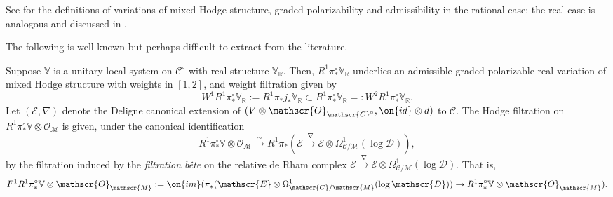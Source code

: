 See \cite[Definitions 14.44, 14.45, and 14.49]{peters2008mixed} for the definitions of variations of mixed Hodge structure, graded-polarizability
and
admissibility in the rational case; the real case is analogous and discussed in \cite[Definition 3.4]{steenbrink1985variation}.

The following is well-known but perhaps difficult to extract from the
literature.
\begin{theorem}
\notready\label{theorem:unitary-MHS}
	Suppose $\mathbb{V}$ is a unitary local system on $\mathscr{C}^\circ$
	with real structure $\mathbb{V}_\mathbb{R}$. Then,
	$R^1\pi^\circ_*\mathbb{V}_\mathbb{R}$ underlies an admissible
	graded-polarizable real variation of mixed Hodge structure with weights
	in $[1,2]$, and weight filtration given by
$$W^1R^1\pi^\circ_*\mathbb{V}_\mathbb{R}:=R^1\pi_*j_*\mathbb{V}_\mathbb{R}\subset R^1\pi^\circ_*\mathbb{V}_\mathbb{R}=:W^2R^1\pi^\circ_*\mathbb{V}_\mathbb{R}.$$
Let $(\mathscr{E}, {\nabla})$ denote the Deligne canonical extension of $(V\otimes \mathscr{O}_{\mathscr{C}^\circ}, \on{id}\otimes d)$ to $\mathscr{C}$. The Hodge filtration on $R^1\pi^\circ_*\mathbb{V}\otimes \mathscr{O}_{\mathscr{M}}$ is given, under the canonical identification $$R^1\pi^\circ_*\mathbb{V}\otimes \mathscr{O}_{\mathscr{M}}\overset{\sim}{\longrightarrow} R^1\pi_*(\mathscr{E}\overset{{\nabla}}{\longrightarrow}\mathscr{E}\otimes \Omega^1_{\mathscr{C}/\mathscr{M}}(\log \mathscr{D})),$$ by the filtration induced by the \emph{filtration b\^{e}te} on the relative de Rham complex $\mathscr{E}\overset{{\nabla}}{\longrightarrow}\mathscr{E}\otimes \Omega^1_{\mathscr{C}/\mathscr{M}}(\log \mathscr{D})$.
That is, $$F^1R^1\pi^\circ_*\mathbb{V}\otimes \mathscr{O}_\mathscr{M}:=\on{im}(\pi_*(\mathscr{E}\otimes \Omega^1_{\mathscr{C}/\mathscr{M}}(\log \mathscr{D}))\to R^1\pi^\circ_*\mathbb{V}\otimes \mathscr{O}_\mathscr{M}).$$
\end{theorem}
